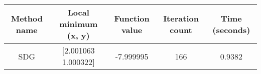 \begin{tabular}{|c|c|c|c|c|}
    \hline
    Method name & Local minimum (x, y) & Function value & Iteration count & Time (seconds)\\
    \hline
    SDG & [2.001063 1.000322] & -7.999995 & 166 & 0.9382\\
    \hline
\end{tabular}